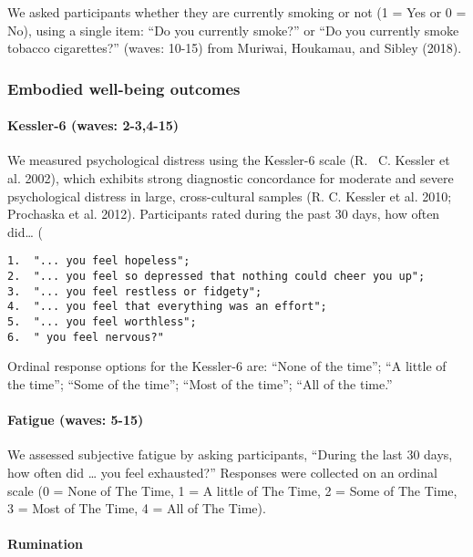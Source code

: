 \documentclass[
  letterpaper,
  DIV=11,
  numbers=noendperiod]{scrartcl}
\let\oldparagraph\paragraph
\renewcommand{\paragraph}[1]{\oldparagraph{#1}\mbox{}}
\begin{document}
We asked participants whether they are currently smoking or not (1 = Yes
or 0 = No), using a single item: ``Do you currently smoke?'' or ``Do you
currently smoke tobacco cigarettes?'' (waves: 10-15) from Muriwai,
Houkamau, and Sibley (2018).

\hypertarget{embodied-well-being-outcomes}{%
\subsubsection{Embodied well-being
outcomes}\label{embodied-well-being-outcomes}}

\hypertarget{kessler-6-waves-2-34-15}{%
\paragraph{Kessler-6 (waves: 2-3,4-15)}\label{kessler-6-waves-2-34-15}}

We measured psychological distress using the Kessler-6 scale (R. ~C.
Kessler et al. 2002), which exhibits strong diagnostic concordance for
moderate and severe psychological distress in large, cross-cultural
samples (R. C. Kessler et al. 2010; Prochaska et al. 2012). Participants
rated during the past 30 days, how often did\ldots{} (

\begin{verbatim}
1.  "... you feel hopeless";
2.  "... you feel so depressed that nothing could cheer you up";
3.  "... you feel restless or fidgety";
4.  "... you feel that everything was an effort";
5.  "... you feel worthless";
6.  " you feel nervous?"
\end{verbatim}

Ordinal response options for the Kessler-6 are: ``None of the time'';
``A little of the time''; ``Some of the time''; ``Most of the time'';
``All of the time.''

\hypertarget{fatigue-waves-5-15}{%
\paragraph{Fatigue (waves: 5-15)}\label{fatigue-waves-5-15}}

We assessed subjective fatigue by asking participants, ``During the last
30 days, how often did \ldots{} you feel exhausted?'' Responses were
collected on an ordinal scale (0 = None of The Time, 1 = A little of The
Time, 2 = Some of The Time, 3 = Most of The Time, 4 = All of The Time).

\hypertarget{rumination}{%
\paragraph{Rumination}\label{rumination}}
\end{document}
